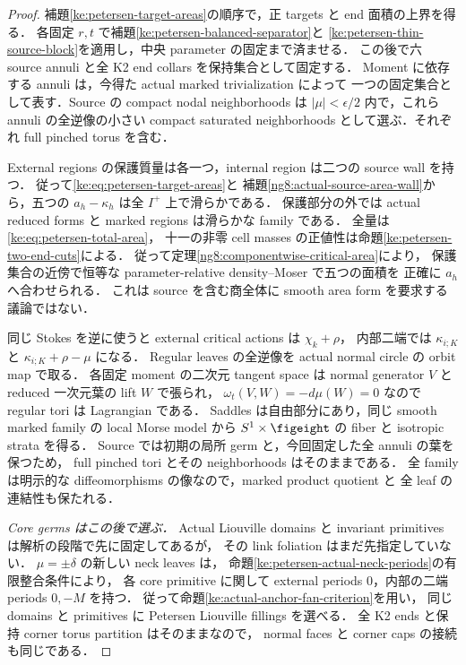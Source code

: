\begin{proof}
補題\ref{ke:petersen-target-areas}の順序で，正 targets と end 面積の上界を得る．
各固定 $r,t$ で補題\ref{ke:petersen-balanced-separator}と
\ref{ke:petersen-thin-source-block}を適用し，中央 parameter の固定まで済ませる．
この後で六 source annuli と全 K2 end collars を保持集合として固定する．
Moment に依存する annuli は，今得た actual marked trivialization によって
一つの固定集合として表す．Source の compact nodal neighborhoods は
$|\mu|<\epsilon/2$ 内で，これら annuli の全逆像の小さい compact saturated
neighborhoods として選ぶ．それぞれ full pinched torus を含む．

External regions の保護質量は各一つ，internal region は二つの source wall を持つ．
従って\eqref{ke:eq:petersen-target-areas}と
補題\ref{ng8:actual-source-area-wall}から，五つの
$a_h-\kappa_h$ は全 $I^+$ 上で滑らかである．
保護部分の外では actual reduced forms と marked regions は滑らかな family である．
全量は\eqref{ke:eq:petersen-total-area}，
十一の非零 cell masses の正値性は命題\ref{ke:petersen-two-end-cuts}による．
従って定理\ref{ng8:componentwise-critical-area}により，
保護集合の近傍で恒等な parameter-relative density--Moser で五つの面積を
正確に $a_h$ へ合わせられる．
これは source を含む商全体に smooth area form を要求する議論ではない．

同じ Stokes を逆に使うと external critical actions は $\chi_k+\rho$，
内部二端では $\kappa_{i;K}$ と $\kappa_{i;K}+\rho-\mu$ になる．
Regular leaves の全逆像を actual normal circle の orbit map で取る．
各固定 moment の二次元 tangent space は normal generator $V$ と
reduced 一次元葉の lift $W$ で張られ，
$\omega_t(V,W)=-d\mu(W)=0$ なので regular tori は Lagrangian である．
Saddles は自由部分にあり，同じ smooth marked family の local Morse model から
$S^1\times\figeight$ の fiber と isotropic strata を得る．
Source では初期の局所 germ と，今回固定した全 annuli の葉を保つため，
full pinched tori とその neighborhoods はそのままである．
全 family は明示的な diffeomorphisms の像なので，marked product quotient と
全 leaf の連結性も保たれる．

\emph{Core germs はこの後で選ぶ．}
Actual Liouville domains と invariant primitives は解析の段階で先に固定してあるが，
その link foliation はまだ先指定していない．
$\mu=\pm\delta$ の新しい neck leaves は，
命題\ref{ke:petersen-actual-neck-periods}の有限整合条件により，
各 core primitive に関して external periods $0$，内部の二端 periods $0,-M$ を持つ．
従って命題\ref{ke:actual-anchor-fan-criterion}を用い，
同じ domains と primitives に Petersen Liouville fillings を選べる．
全 K2 ends と保持 corner torus partition はそのままなので，
normal faces と corner caps の接続も同じである．


\end{proof}
